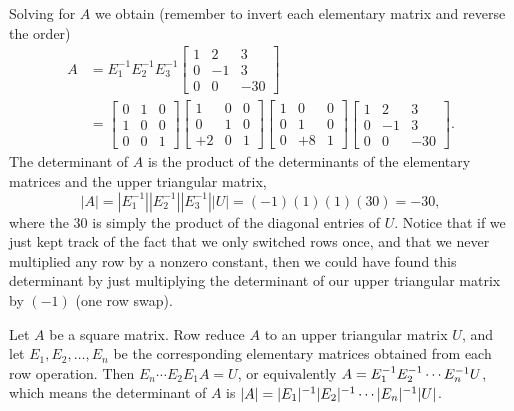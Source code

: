 \begin{example}
$$$$
Solving for $A$ we obtain (remember to invert each elementary matrix and reverse the order)
\begin{align*}
A&=E_1^{-1}E_2^{-1}E_3^{-1}\begin{bmatrix}
 1 & 2 & 3 \\
 0 & -1 & 3 \\
 0 & 0 & -30
\end{bmatrix}\\
&=
\begin{bmatrix}
 0 & 1 & 0 \\
 1 & 0 & 0 \\
 0 & 0 & 1
\end{bmatrix}
\begin{bmatrix}
 1 & 0 & 0 \\
 0 & 1 & 0 \\
 +2 & 0 & 1
\end{bmatrix}
\begin{bmatrix}
 1 & 0 & 0 \\
 0 & 1 & 0 \\
 0 & +8 & 1
\end{bmatrix}
\begin{bmatrix}
 1 & 2 & 3 \\
 0 & -1 & 3 \\
 0 & 0 & -30
\end{bmatrix}.
\end{align*}
The determinant of $A$ is the product of the determinants of the elementary matrices and the upper triangular matrix, $$|A|=|E_1^{-1}||E_2^{-1}||E_3^{-1}||U|=(-1)(1)(1)(30)=-30,$$ where the 30 is simply the product of the diagonal entries of $U$. 
Notice that if we just kept track of the fact that we only switched rows once, and that we never multiplied any row by a nonzero constant, then we could have found this determinant by just multiplying the determinant of our upper triangular matrix by $(-1)$ (one row swap).
\end{example}  

\begin{theorem}
Let $A$ be a square matrix. Row reduce $A$ to an upper triangular matrix $U$, and let $E_1, E_2, \ldots, E_n$ be the corresponding elementary matrices obtained from each row operation.  
Then $E_n\cdots E_2E_1A=U$, or equivalently $A=E_1^{-1} E_2^{-1} \cdots E_n^{-1} U$, which means the determinant of $A$ is $|A|=|E_1|^{-1} |E_2|^{-1} \cdots |E_n|^{-1} |U|$.  
\end{theorem}

